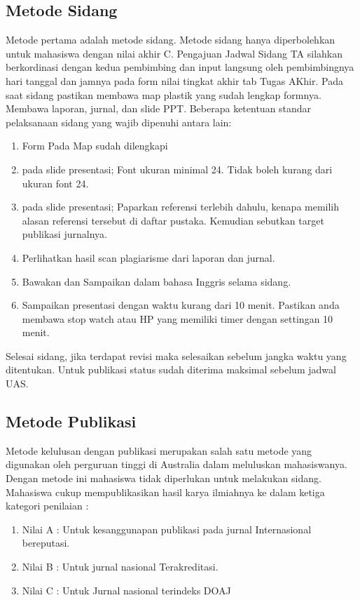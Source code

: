 \subsection{Metode Sidang}
Metode pertama adalah metode sidang. Metode sidang hanya diperbolehkan untuk mahasiswa dengan nilai akhir C. 
Pengajuan Jadwal Sidang TA silahkan berkordinasi dengan kedua pembimbing dan input langsung oleh pembimbingnya hari tanggal dan jamnya pada form nilai tingkat akhir tab Tugas AKhir. Pada saat sidang pastikan membawa map plastik yang sudah lengkap formnya. Membawa laporan, jurnal, dan slide PPT. Beberapa ketentuan standar pelaksanaan sidang yang wajib dipenuhi antara lain: 
\begin{enumerate}
	\item Form Pada Map sudah dilengkapi
	\item pada slide presentasi; Font ukuran minimal 24. Tidak boleh kurang dari ukuran font 24.
	\item pada slide presentasi; Paparkan referensi terlebih dahulu, kenapa memilih alasan referensi tersebut di daftar pustaka. Kemudian sebutkan target publikasi jurnalnya.
	\item Perlihatkan hasil scan plagiarisme dari laporan dan jurnal.
	\item Bawakan dan Sampaikan dalam bahasa Inggris selama sidang.
	\item Sampaikan presentasi dengan waktu kurang dari 10 menit. Pastikan anda membawa stop watch atau HP yang memiliki timer dengan settingan 10 menit.
\end{enumerate}
Selesai sidang, jika terdapat revisi maka selesaikan sebelum jangka waktu yang ditentukan. Untuk publikasi status sudah diterima maksimal sebelum jadwal UAS.

\subsection{Metode Publikasi}
Metode kelulusan dengan publikasi merupakan salah satu metode yang digunakan oleh perguruan tinggi di Australia dalam meluluskan mahasiswanya.
Dengan metode ini mahasiswa tidak diperlukan untuk melakukan sidang. Mahasiswa cukup mempublikasikan hasil karya ilmiahnya ke dalam ketiga kategori penilaian :
\begin{enumerate}
	\item Nilai A : Untuk kesanggunapan publikasi pada jurnal Internasional bereputasi.
	\item Nilai B : Untuk jurnal nasional Terakreditasi.
	\item Nilai C : Untuk Jurnal nasional terindeks DOAJ
\end{enumerate}

